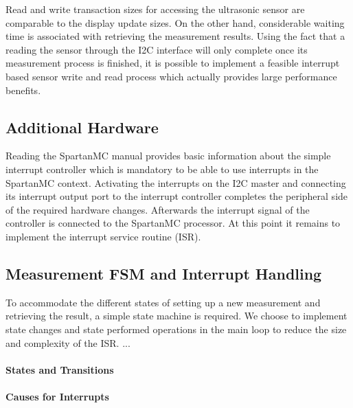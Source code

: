 			Read and write transaction sizes for accessing the ultrasonic sensor are comparable to the display update sizes. On the other hand, considerable waiting time is associated with retrieving the measurement results. Using the fact that a reading the sensor through the I2C interface will only complete once its measurement process is finished, it is possible to implement a feasible interrupt based sensor write and read process which actually provides large performance benefits.

		\subsection{Additional Hardware} %
		\label{sub:additional_hardware}
			Reading the SpartanMC manual provides basic information about the simple interrupt controller which is mandatory to be able to use interrupts in the SpartanMC context. Activating the interrupts on the I2C master and connecting its interrupt output port to the interrupt controller completes the peripheral side of the required hardware changes. Afterwards the interrupt signal of the controller is connected to the SpartanMC processor. At this point it remains to implement the interrupt service routine (ISR).

		\subsection{Measurement FSM and Interrupt Handling} %
		\label{sub:measurement_fsm_and_interrupt_handling}
			To accommodate the different states of setting up a new measurement and retrieving the result, a simple state machine is required. We choose to implement state changes and state performed operations in the main loop to reduce the size and complexity of the ISR.
			...

			\paragraph{States and Transitions} %
			\label{par:states_and_transitions}

			\paragraph{Causes for Interrupts} %
			\label{par:causes_for_interrupts}

